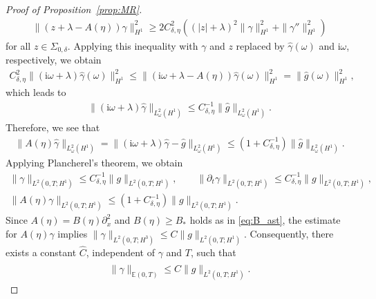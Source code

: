 \documentclass{article}
\theoremstyle{remark}
\theoremstyle{definition}
\numberwithin{equation}{section}
\begin{document}
\begin{proof}[Proof of Proposition~\ref{prop:MR}]
    \begin{align*}
        \|(z+\lambda-A(\eta))\gamma\|_{H^1}^2 \ge 2C_{\delta,\eta}^2\left((|z|+\lambda)^2\|\gamma\|_{H^1}^2 + \|\gamma''\|_{H^1}^2\right)
    \end{align*}
    for all $z\in\Sigma_{0,\delta}$.
    Applying this inequality with $\gamma$ and $z$ replaced by $\hat{\gamma}(\omega)$ and $\mathrm{i}\omega$, respectively, we obtain
    \begin{align*}
        C_{\delta,\eta}^2\|(\mathrm{i}\omega+\lambda)\hat{\gamma}(\omega)\|_{H^1}^2 \le \|(\mathrm{i}\omega+\lambda-A(\eta))\hat{\gamma}(\omega)\|_{H^1}^2 = \|\hat{g}(\omega)\|_{H^1}^2,
    \end{align*}
    which leads to
    \begin{align*}
        \|(\mathrm{i}\omega+\lambda)\hat{\gamma}\|_{L_\omega^2(H^1)} \le C_{\delta,\eta}^{-1}\|\hat{g}\|_{L_\omega^2(H^1)}.
    \end{align*}
    Therefore, we see that
    \begin{align*}
        \|A(\eta)\hat{\gamma}\|_{L_\omega^2(H^1)}
        =\|(\mathrm{i}\omega+\lambda)\hat{\gamma} - \hat{g}\|_{L_\omega^2(H^1)}
        \le\left(1+C_{\delta,\eta}^{-1}\right)\|\hat{g}\|_{L_\omega^2(H^1)}.
    \end{align*}
    Applying Plancherel's theorem, we obtain 
    \begin{gather*}
        \|\gamma\|_{L^2(0,T;H^1)} \le C_{\delta,\eta}^{-1}\|g\|_{L^2(0,T;H^1)},\qquad
        \|\partial_t \gamma\|_{L^2(0,T;H^1)} \le C_{\delta,\eta}^{-1}\|g\|_{L^2(0,T;H^1)},\\
        \|A(\eta)\gamma\|_{L^2(0,T;H^1)} \le \left(1+C_{\delta,\eta}^{-1}\right)\|g\|_{L^2(0,T;H^1)}.
    \end{gather*}
    Since $A(\eta)=B(\eta)\partial_x^2$ and $B(\eta)\ge B_\ast$ holds as in \eqref{eq:B_ast}, the estimate for $A(\eta)\gamma$ implies $\|\gamma\|_{L^2(0,T;H^3)} \le C \|g\|_{L^2(0,T;H^1)}$.
    Consequently, there exists a constant $\hat{C}$, independent of $\gamma$ and $T$, such that
    \begin{align}
        \|\gamma\|_{\mathbb{E}(0,T)} \le \hat{C}\|g\|_{L^2(0,T;H^1)}.
        \label{eq:estimate_lambda}
    \end{align}


\end{proof}
\end{document}
